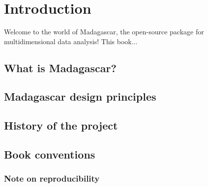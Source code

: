 \chapter{Introduction}

Welcome to the world of Madagascar, the open-source package for
multidimensional data analysis! This book...

\section{What is Madagascar?}

\section{Madagascar design principles}

\section{History of the project}

\section{Book conventions}

\subsection{Note on reproducibility}

